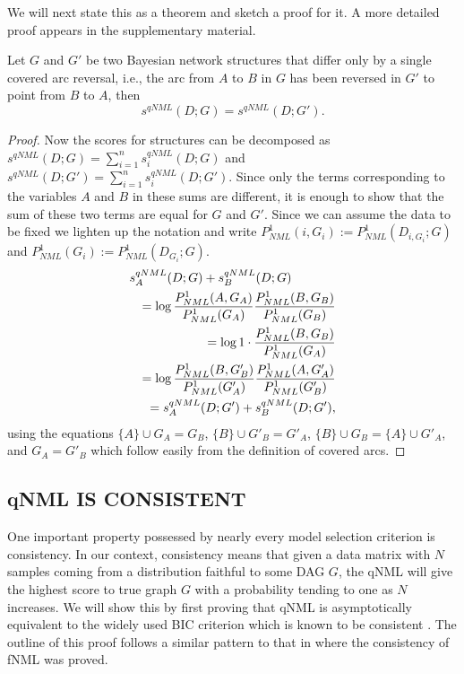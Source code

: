 We will next state this as a
theorem and sketch a proof for it. A more detailed proof appears in the
supplementary material.
\begin{theorem}
  \label{thm:scoreqv}
  Let $G$ and $G'$ be two Bayesian network structures that differ only
  by a single covered arc reversal, i.e., the arc from $A$ to $B$ in $G$
  has been reversed in $G'$ to point from $B$ to $A$, then
  $$s^{qNML}(D;G)=s^{qNML}(D;G').$$
\end{theorem}
\begin{proof}
  Now the scores for structures can be decomposed as
  $s^{qNML}(D;G)=\sum_{i=1}^{n}s_i^{qNML}(D;G)$ and
  $s^{qNML}(D;G')=\sum_{i=1}^{n}s_i^{qNML}(D;G')$.  Since only the
  terms corresponding to the variables $A$ and $B$ in these sums are
  different, it is enough to show that the sum of these two terms are
  equal for $G$ and $G'$. Since we can assume the data to be fixed we
  lighten up the notation and write
  $P^1_{NML}(i,G_i) := P^1_{NML}(D_{i,G_i};G)$ and
  $P^1_{NML}(G_i)   := P^1_{NML}(D_{G_i};G)$.
  \begin{eqnarray}
    \lefteqn{s_A^{qNML}(D;G)+s_B^{qNML}(D;G)} \nonumber\\
    && =\log\frac{P^1_{NML}(A,G_{A})}{P^1_{NML}(G_{A})}
            \frac{P^1_{NML}(B,G_{B})}{P^1_{NML}(G_{B})}\nonumber\\
    && =\log 1\cdot\frac{P^1_{NML}(B,G_{B})}{P^1_{NML}(G_{A})}\nonumber\\
    && =\log \frac{P^1_{NML}(B,G'_{B})}{P^1_{NML}(G'_{A})}
             \frac{P^1_{NML}(A,G'_{A})}{P^1_{NML}(G'_{B})}\nonumber\\
 && =s_A^{qNML}(D;G')+s_B^{qNML}(D;G'),\nonumber
\end{eqnarray}
  using the equations $\{A\}\cup G_A = G_B$, $\{B\}\cup G'_B = G'_A$,
  $\{B\}\cup G_B = \{A\} \cup G'_A$, and $G_A = G'_B$ which follow
  easily from the definition of covered arcs.
\end{proof}

\subsection{qNML IS CONSISTENT}

One important property possessed by nearly every model selection
criterion is consistency. In our context, consistency means that given
a data matrix with $N$ samples coming from a distribution faithful to
some DAG $G$, the qNML will give the highest score to true graph $G$
with a probability tending to one as $N$ increases. We will show this
by first proving that qNML is asymptotically equivalent to the widely used
BIC criterion which is known to be consistent \cite{Schw78, Haug88}.
The outline of this proof follows a similar pattern to that in
\cite{SilanderIJAR10} where the consistency of fNML was proved.


